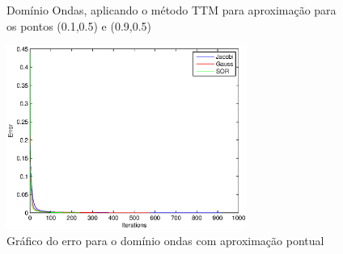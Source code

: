 \documentclass{article}
\begin{document}
\begin{figure}
			\caption{Domínio Ondas, aplicando o método TTM para aproximação para os pontos (0.1,0.5) e (0.9,0.5)}
			\label{fig:ondas:ttm}
			\centering
			\includegraphics[width=0.7\textwidth]{figures/waves-ttm-error.eps}
			\caption{Gráfico do erro para o domínio ondas com aproximação pontual}
			\label{fig:ondas:ttm:erro}
		\end{figure}
\end{document}
